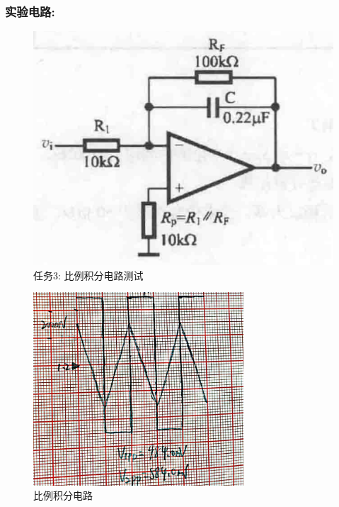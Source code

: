 \documentclass[a4paper,11pt,UTF8]{article}
\begin{document}
\subsubsection{实验电路:}
\begin{figure}[H]
	\centering
	\includegraphics[scale=0.18]{1.4}
	\caption*{任务3: 比例积分电路测试}
\end{figure}
\begin{figure}[H]
	\centering
	\includegraphics[width=0.7\textwidth]{1.12}
	\caption*{比例积分电路}
\end{figure}
\end{document}
